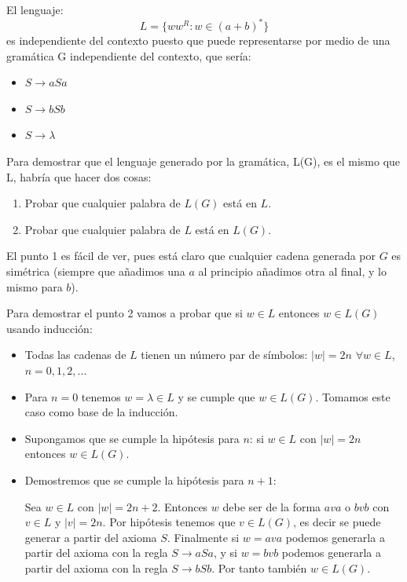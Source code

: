 \documentclass{apuntes}
\begin{document}
\begin{example}
El lenguaje:
\[L = \lbrace ww^R : w \in (a+b)^*\rbrace\]
es independiente del contexto puesto que puede representarse por medio de una gramática G independiente del contexto, que sería:
\begin{itemize}
\item $S \rightarrow aSa$
\item $S \rightarrow bSb$
\item $S \rightarrow \lambda$
\end{itemize}

\newpage
Para demostrar que el lenguaje generado por la gramática, L(G), es el mismo que L, habría que hacer dos cosas:

\begin{enumerate}
\item Probar que cualquier palabra de $L(G)$ está en $L$.
\item Probar que cualquier palabra de $L$ está en $L(G)$.
\end{enumerate}

El punto 1 es fácil de ver, pues está claro que cualquier cadena generada por $G$ es simétrica (siempre que añadimos una $a$ al principio añadimos otra al final, y lo mismo para $b$).

Para demostrar el punto 2 vamos a probar que si $w \in L$ entonces $w \in L(G)$ usando inducción:

\begin{itemize}
\item Todas las cadenas de $L$ tienen un número par de símbolos: $|w| = 2n$  $\forall w \in L$, $n=0,1,2,...$

\item Para $n=0$ tenemos $w = \lambda \in L$ y se cumple que $w \in L(G)$. Tomamos este caso como base de la inducción.

\item Supongamos que se cumple la hipótesis para $n$: si $w \in L$ con $|w| = 2n$ entonces $w \in L(G)$.

\item Demostremos que se cumple la hipótesis para $n+1$:

Sea $w \in L$ con $|w| = 2n+2$. Entonces $w$ debe ser de la forma $ava$ o $bvb$ con $v \in L$ y $|v| = 2n$. Por hipótesis tenemos que $v \in L(G)$, es decir se puede generar a partir del axioma $S$. Finalmente si $w = ava$ podemos generarla a partir del axioma con la regla $S \rightarrow aSa$, y si $w = bvb$ podemos generarla a partir del axioma con la regla $S \rightarrow bSb$. Por tanto también $w \in L(G)$.

\end{itemize}

\end{example}
\end{document}
